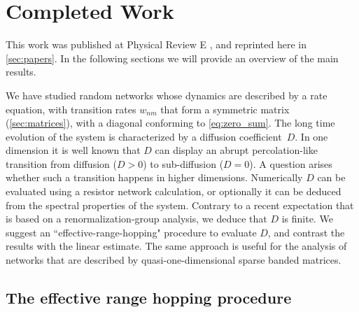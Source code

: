 \chapter{Completed Work}


This work was published at Physical Review E \cite{de_leeuw_diffusion_2012},
and reprinted here in \autoref{sec:papers}. In the
following sections we will provide an overview
of the main results.









We have studied random networks whose dynamics are
described by a rate equation, with transition rates $w_{nm}$
that form a symmetric matrix (\autoref{sec:matrices}),
with a diagonal conforming to \autoref{eq:zero_sum}. 
%
The long time evolution
of the system is characterized by a diffusion coefficient~$D$.
In one dimension it is well known that $D$ can display an abrupt
percolation-like transition from diffusion (${D>0}$)
to sub-diffusion (${D=0}$). 
%
A question arises whether
such a transition happens in higher dimensions.
Numerically $D$ can be evaluated using a resistor network
calculation, or optionally it can be deduced from 
the spectral properties of the system. Contrary to a recent 
expectation that is based on a renormalization-group analysis, 
we deduce that $D$ is finite.
%
We suggest an ``effective-range-hopping" procedure to evaluate $D$,
and contrast the results with the linear estimate.
The same approach is useful for the analysis of 
networks that are described by quasi-one-dimensional  
sparse banded matrices. 


\section{The effective range hopping procedure}


